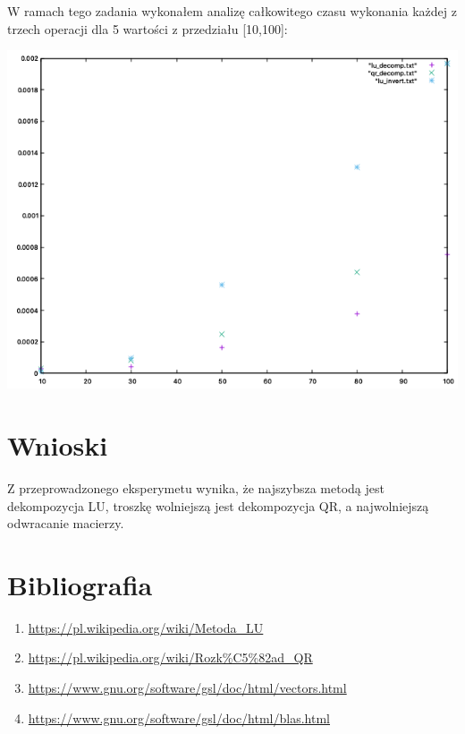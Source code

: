 \documentclass[5]{article}
\begin{document}
\hspace{4mm} W ramach tego zadania wykonałem analizę całkowitego czasu wykonania każdej z trzech operacji dla 5 wartości z przedziału [10,100]:


\begin{center}
    \includegraphics[scale=0.6]{porównanie.png} \par
    \vspace{3mm}
\end{center}


\section{Wnioski}
Z przeprowadzonego eksperymetu wynika, że najszybsza metodą jest dekompozycja LU, troszkę wolniejszą jest dekompozycja QR, a najwolniejszą odwracanie macierzy.

\section{Bibliografia}

\begin{enumerate}
  \item \url{https://pl.wikipedia.org/wiki/Metoda_LU}
  \item \url{https://pl.wikipedia.org/wiki/Rozk%C5%82ad_QR}
  \item \url{https://www.gnu.org/software/gsl/doc/html/vectors.html}
  \item \url{https://www.gnu.org/software/gsl/doc/html/blas.html}
\end{enumerate}
\end{document}
